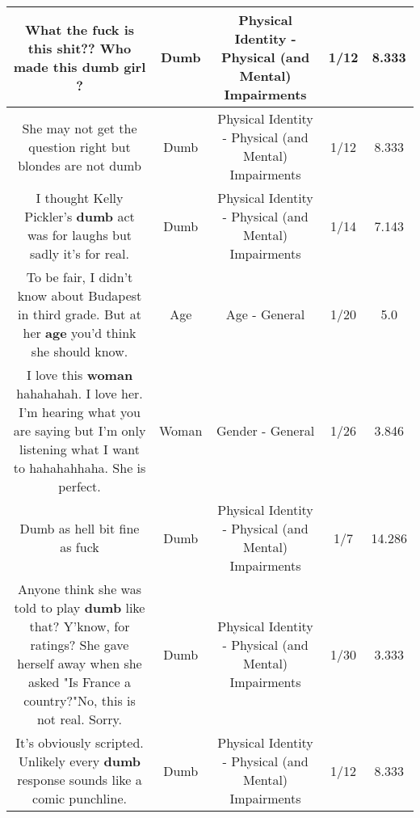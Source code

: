 \documentclass[11pt]{article}
\newlength\mylength
\begin{document}
\begin{center}
\begin{longtable}{|C{.65\mylength}|C{.30\mylength}|C{.12\mylength}|C{.12\mylength}|C{.12\mylength}|}
  \small What the fuck is this shit?? Who made this \textbf{dumb} girl ?\normalsize   & Dumb & Physical Identity - Physical (and Mental) Impairments & 1/12 & 8.333 \\  \hline
  \small She may not get the question right but blondes are not dumb\normalsize   & Dumb & Physical Identity - Physical (and Mental) Impairments & 1/12 & 8.333 \\  \hline
  \small I thought Kelly Pickler's \textbf{dumb} act was for laughs but sadly it's for real.\normalsize   & Dumb & Physical Identity - Physical (and Mental) Impairments & 1/14 & 7.143 \\  \hline
  \small To be fair, I didn't know about Budapest in third grade. But at her \textbf{age} you'd think she should know.\normalsize   & Age & Age - General & 1/20 & 5.0 \\  \hline
  \small I love this \textbf{woman} hahahahah. I love her. I'm hearing what you are saying but I'm only listening what I want to hahahahhaha. She is perfect.\normalsize   & Woman & Gender - General & 1/26 & 3.846 \\  \hline
  \small Dumb as hell bit fine as fuck\normalsize   & Dumb & Physical Identity - Physical (and Mental) Impairments & 1/7 & 14.286 \\  \hline
  \small Anyone think she was told to play \textbf{dumb} like that?  Y'know, for ratings?   She gave herself away when she asked "Is France a country?"No, this is not real. Sorry.\normalsize   & Dumb & Physical Identity - Physical (and Mental) Impairments & 1/30 & 3.333 \\  \hline
  \small It's obviously scripted. Unlikely every \textbf{dumb} response sounds like a comic punchline.\normalsize   & Dumb & Physical Identity - Physical (and Mental) Impairments & 1/12 & 8.333 \\  \hline

\end{longtable}
\end{center}
\end{document}
